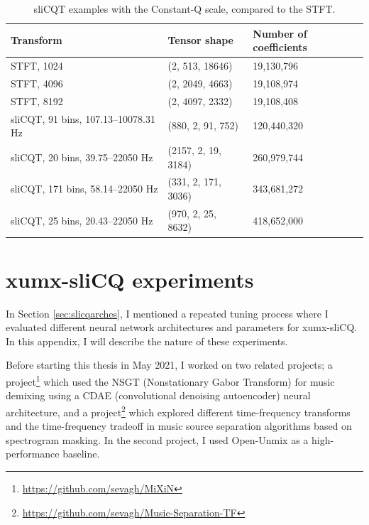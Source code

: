 \documentclass[report.tex]{subfiles}
\begin{document}
\begin{appendices}
\begin{table}[ht]
	\centering
	\caption{sliCQT examples with the Constant-Q scale, compared to the STFT.}
	\label{table:slicqdimstft1}
\begin{tabular}{ |l|l|l| }
	 \hline
	 Transform & Tensor shape & Number of coefficients \\
	 \hline
	 \hline
	 STFT, 1024 & (2, 513, 18646) & 19,130,796  \\
	 \hline
	 STFT, 4096 & (2, 2049, 4663) & 19,108,974  \\
	 \hline
	 STFT, 8192 & (2, 4097, 2332) & 19,108,408  \\
	 \hline
	 \hline
	 sliCQT, 91 bins, 107.13--10078.31 Hz & (880, 2, 91, 752) & 120,440,320 \\
	 \hline
	 sliCQT, 20 bins, 39.75--22050 Hz & (2157, 2, 19, 3184) & 260,979,744 \\
	 \hline
	 sliCQT, 171 bins, 58.14--22050 Hz & (331, 2, 171, 3036) & 343,681,272 \\
	 \hline
	 sliCQT, 25 bins, 20.43--22050 Hz & (970, 2, 25, 8632) & 418,652,000 \\
	 \hline
\end{tabular}
\end{table}

\newpagefill

\section{xumx-sliCQ experiments}
\label{appendix:crazyexperiments}

In Section \ref{sec:slicqarches}, I mentioned a repeated tuning process where I evaluated different neural network architectures and parameters for xumx-sliCQ. In this appendix, I will describe the nature of these experiments.

Before starting this thesis in May 2021, I worked on two related projects; a project\footnote{\url{https://github.com/sevagh/MiXiN}} which used the NSGT (Nonstationary Gabor Transform) for music demixing using a CDAE (convolutional denoising autoencoder) neural architecture, and a project\footnote{\url{https://github.com/sevagh/Music-Separation-TF}} which explored different time-frequency transforms and the time-frequency tradeoff in music source separation algorithms based on spectrogram masking. In the second project, I used Open-Unmix as a high-performance baseline.


\end{appendices}
\end{document}
